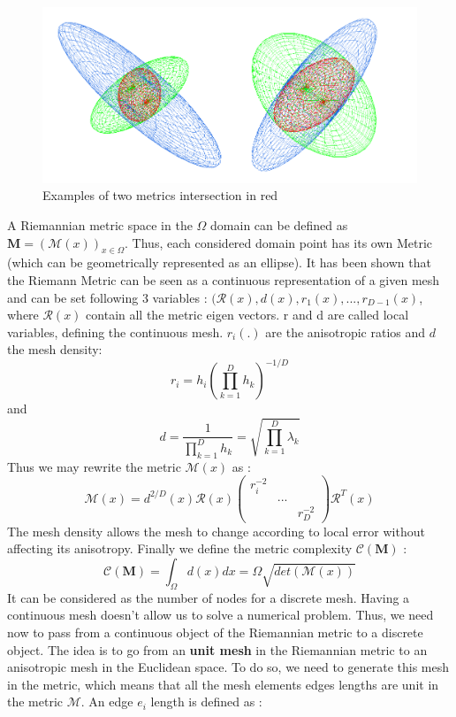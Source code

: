 \documentclass[11pt, a4paper, English]{report}
\begin{document}
\begin{appendix}
\begin{figure}[h!]
    \centering
    \includegraphics[width=\textwidth]{metric_2.png}
    \caption{Examples of two metrics intersection in red \cite{Fredo}}
    \label{gric}
\end{figure}
A Riemannian metric space in the $\Omega$ domain can be defined as $\boldsymbol{M} = (\mathcal{M}(x))_{x \in \Omega}$. Thus, each considered domain point has its own Metric (which can be geometrically represented as an ellipse). It has been shown that the Riemann Metric can be seen as a continuous representation of a given mesh \cite{Loseille2011a} \cite{Loseille2011b} and can be set following 3 variables : $(\mathcal{R}(x), d(x), r_1(x),..., r_{D-1}(x)$, where $\mathcal{R}(x)$ contain all the metric eigen vectors. r and d are called local variables, defining the continuous mesh. $r_i(.)$ are the anisotropic ratios and $d$ the mesh density:
$$ r_i = h_i(\prod_{k=1}^D h_k)^{-1/D}$$
and
$$ d = \frac{1}{\prod_{k=1}^D h_k} = \sqrt{\prod_{k=1}^D \lambda_k}$$
Thus we may rewrite the metric $\mathcal{M}(x)$ as \cite{Janthesis}:
$$\mathcal{M}(x) = d^{2/D}(x) \mathcal{R}(x) \begin{pmatrix} r_i^{-2} & & \\& ... & \\ & & r_D^{-2} \end{pmatrix} \mathcal{R}^T (x)$$
The mesh density allows the mesh to change according to local error without affecting its anisotropy. Finally we define the metric complexity $\mathcal{C}(\boldsymbol{M})$ :
$$ \mathcal{C}(\boldsymbol{M}) = \int_\Omega d(x)dx = \Omega \sqrt{det (\mathcal{M}(x))}$$
It can be considered as the number of nodes for a discrete mesh. Having a continuous mesh doesn't allow us to solve a numerical problem. Thus, we need now to pass from a continuous object of the Riemannian metric to a discrete object. The idea is to go from an \textbf{unit mesh} in the Riemannian metric to an anisotropic mesh in the Euclidean space. To do so, we need to generate this mesh in the metric, which means that all the mesh elements edges lengths are unit in the metric $\mathcal{M}$. An edge $e_i$ length is defined as :

\end{appendix}
\end{document}
